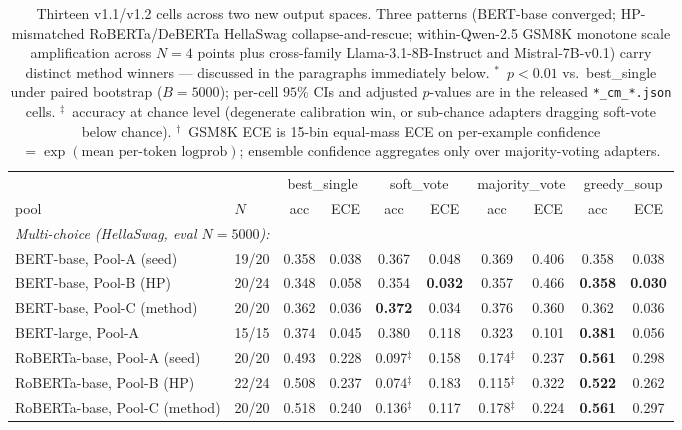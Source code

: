 \documentclass[11pt]{article}
\begin{document}
\begin{table}[t]
\centering
\caption{Thirteen v1.1/v1.2 cells across two new output spaces. Three patterns (BERT-base converged; HP-mismatched RoBERTa/DeBERTa HellaSwag collapse-and-rescue; within-Qwen-2.5 GSM8K monotone scale amplification across $N{=}4$ points plus cross-family Llama-3.1-8B-Instruct and Mistral-7B-v0.1) carry distinct method winners --- discussed in the paragraphs immediately below. $^{*}$~$p{<}0.01$ vs.\ best\_single under paired bootstrap ($B{=}5000$); per-cell $95\%$ CIs and adjusted $p$-values are in the released \texttt{*\_cm\_*.json} cells. $^{\ddagger}$~accuracy at chance level (degenerate calibration win, or sub-chance adapters dragging soft-vote below chance). $^{\dagger}$~GSM8K ECE is 15-bin equal-mass ECE on per-example confidence $=\exp(\text{mean per-token logprob})$; ensemble confidence aggregates only over majority-voting adapters.}
\label{tab:v11cells}
\small
\setlength{\tabcolsep}{4pt}
\begin{tabular}{ll|cc|cc|cc|cc}
\toprule
& & \multicolumn{2}{c|}{best\_single} & \multicolumn{2}{c|}{soft\_vote} & \multicolumn{2}{c|}{majority\_vote} & \multicolumn{2}{c}{greedy\_soup} \\
pool & $N$ & acc & ECE & acc & ECE & acc & ECE & acc & ECE \\
\midrule
\multicolumn{10}{l}{\emph{Multi-choice (HellaSwag, eval $N{=}5000$):}} \\
\quad BERT-base, Pool-A (seed)         & 19/20 & 0.358 & 0.038 & 0.367 & 0.048 & 0.369 & 0.406 & 0.358 & 0.038 \\
\quad BERT-base, Pool-B (HP)           & 20/24 & 0.348 & 0.058 & 0.354 & \textbf{0.032} & 0.357 & 0.466 & \textbf{0.358} & \textbf{0.030} \\
\quad BERT-base, Pool-C (method)       & 20/20 & 0.362 & 0.036 & \textbf{0.372} & 0.034 & 0.376 & 0.360 & 0.362 & 0.036 \\
\quad BERT-large, Pool-A               & 15/15 & 0.374 & 0.045 & 0.380 & 0.118 & 0.323 & 0.101 & \textbf{0.381} & 0.056 \\
\quad RoBERTa-base, Pool-A (seed)      & 20/20 & 0.493 & 0.228 & 0.097$^{\ddagger}$ & 0.158 & 0.174$^{\ddagger}$ & 0.237 & \textbf{0.561} & 0.298 \\
\quad RoBERTa-base, Pool-B (HP)        & 22/24 & 0.508 & 0.237 & 0.074$^{\ddagger}$ & 0.183 & 0.115$^{\ddagger}$ & 0.322 & \textbf{0.522} & 0.262 \\
\quad RoBERTa-base, Pool-C (method)    & 20/20 & 0.518 & 0.240 & 0.136$^{\ddagger}$ & 0.117 & 0.178$^{\ddagger}$ & 0.224 & \textbf{0.561} & 0.297 \\

\end{tabular}
\end{table}
\end{document}
